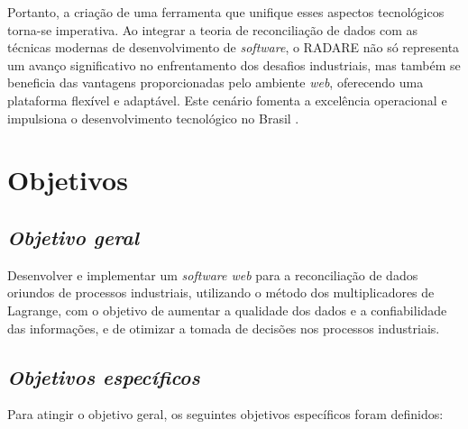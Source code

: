 Portanto, a criação de uma ferramenta que unifique esses aspectos tecnológicos torna-se imperativa. Ao integrar a teoria de reconciliação de dados com as técnicas modernas de desenvolvimento de \textit{software}, o RADARE não só representa um avanço significativo no enfrentamento dos desafios industriais, mas também se beneficia das vantagens proporcionadas pelo ambiente \textit{web}, oferecendo uma plataforma flexível e adaptável. Este cenário fomenta a excelência operacional e impulsiona o desenvolvimento tecnológico no Brasil \cite{industry4status}.

\section{Objetivos}

\subsection{\textit{Objetivo geral}}

Desenvolver e implementar um \textit{software web} para a reconciliação de dados oriundos de processos industriais, utilizando o método dos multiplicadores de Lagrange, com o objetivo de aumentar a qualidade dos dados e a confiabilidade das informações, e de otimizar a tomada de decisões nos processos industriais.

\subsection{\textit{Objetivos específicos}}

Para atingir o objetivo geral, os seguintes objetivos específicos foram definidos:

